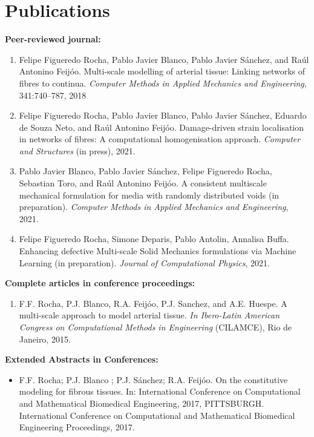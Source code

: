 \documentclass[letterpaper]{twentysecondcv} %
\begin{document}
\section{Publications}
\item \textbf{Peer-reviewed journal:}
\begin{enumerate}
\item Felipe Figueredo Rocha, Pablo Javier Blanco, Pablo Javier Sánchez, and Raúl Antonino Feijóo. Multi-scale modelling of arterial tissue: Linking networks of fibres to continua. \textit{Computer Methods in Applied Mechanics and Engineering}, 341:740–787, 2018
\item Felipe Figueredo Rocha, Pablo Javier Blanco, Pablo Javier Sánchez, Eduardo de Souza Neto, and Raúl Antonino Feijóo. Damage-driven strain localisation in networks of fibres: A computational homogenisation approach. \textit{Computer and Structures} (in press), 2021.
\item Pablo Javier Blanco, Pablo Javier Sánchez, Felipe Figueredo Rocha, Sebastian Toro, and Raúl Antonino Feijóo. A consistent multiscale mechanical formulation for media with randomly distributed voids (in preparation). \textit{Computer Methods in Applied Mechanics and Engineering}, 2021.
\item Felipe Figueredo Rocha, Simone Deparis, Pablo Antolin, Annalisa Buffa.  Enhancing defective Multi-scale Solid Mechanics formulations via Machine Learning (in preparation). \textit{Journal of Computational Physics}, 2021.

\end{enumerate}	
\vskip -0.1cm
\item \textbf{Complete articles in conference proceedings:} 
\begin{enumerate}
	\item F.F. Rocha, P.J. Blanco, R.A. Feijóo, P.J. Sanchez, and A.E. Huespe. A multi-scale approach to model arterial tissue. \textit{In Ibero-Latin American Congress on Computational Methods in Engineering} (CILAMCE), Rio
	de Janeiro, 2015.
\end{enumerate}	
\vskip -0.1cm
\item \textbf{Extended Abstracts in Conferences:}
\begin{itemize}
\item F.F. Rocha; P.J. Blanco ; P.J. Sánchez; R.A. Feijóo. On the constitutive modeling for fibrous tissues. In: International Conference on Computational and Mathematical Biomedical Engineering, 2017, PITTSBURGH. International Conference on Computational and Mathematical Biomedical Engineering Proceedings, 2017.
\end{itemize}
\end{document}
